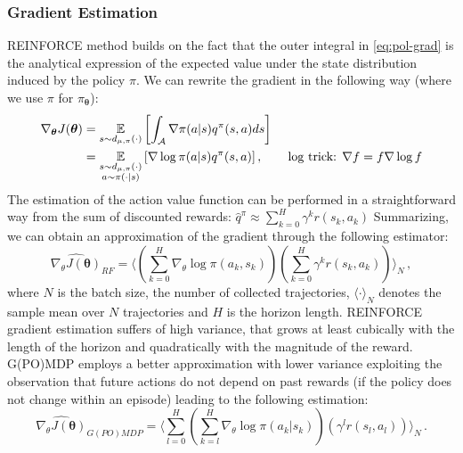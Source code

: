 \subsubsection{Gradient Estimation}
REINFORCE method \citep{reinforce} builds on the fact that the outer integral in \cref{eq:pol-grad} is the analytical expression of the expected value under the state distribution induced by the policy $\pi$. We can rewrite the gradient in the following way (where we use $\pi$ for $\pi_{\boldsymbol{\theta}}$):
\begin{align}
	\nabla_{\boldsymbol{\theta}} J(\boldsymbol{\theta}) &= \underset{s \sim d_{\mu,\pi}(\cdot)}{\mathbb{E}} \left[ \int_\mathcal{A} \nabla \pi(a | s) q^\pi (s,a) ds \right] \\
	& = \underset{\begin{subarray}{c}
					s \sim d_{\mu,\pi}(\cdot) \\
					a \sim \pi(\cdot |s )
				  \end{subarray}}
		{\mathbb{E}} \left[ \nabla \log \pi(a | s) q^\pi(s,a) \right], \tag*{log trick: $\nabla f = f \nabla \log f$} 
\end{align}
The estimation of the action value function can be performed in a straightforward way from the sum of discounted rewards: $\widehat{q}^\pi \approx \sum_{k=0}^H \gamma^k r(s_k,a_k) $
Summarizing, we can obtain an approximation of the gradient through the following estimator:
\begin{equation}
	\widehat{\nabla_\theta J(\boldsymbol{\theta})}_{RF} = \langle \left(\sum_{k=0}^H \nabla_\theta \log \pi(a_k, s_k) \right) \left( \sum_{k=0}^H \gamma^k r(s_k,a_k) \right) \rangle_N \, ,  
\end{equation}
where $N$ is the batch size, the number of collected trajectories, $\langle \cdot \rangle_N$ denotes the sample mean over $N$ trajectories and $H$ is the horizon length. \newline
REINFORCE gradient estimation suffers of high variance, that grows at least cubically with the length of the horizon and quadratically with the magnitude of the reward. \newline
G(PO)MDP \citep{gpomdp} employs a better approximation with lower variance exploiting the observation that future actions do not depend on past rewards (if the policy does not change within an episode) leading to the following estimation:
\begin{equation}
	\widehat{\nabla_\theta J(\boldsymbol{\theta})}_{G(PO)MDP} = \langle \sum_{l=0}^H \left( \sum_{k=l}^H \nabla_\theta \log \pi(a_k | s_k) \right) \left( \gamma^l r(s_l,a_l) \right) \rangle_N \, .
\end{equation}
